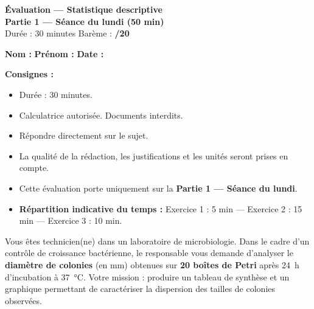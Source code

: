 \documentclass[11pt,a4paper]{article}
\title{}
\author{}
\date{}
\begin{document}

\begin{center}
  {\Large \textbf{Évaluation — Statistique descriptive}}\\[0.2cm]
  {\large \textbf{Partie 1 — Séance du lundi (50 min)}}\\[0.2cm]
  {\large Durée : 30 minutes \hfill Barème : \textbf{/20}}
\end{center}

\vspace{0.3cm}

\textbf{Nom :} \dotfill \quad \textbf{Prénom :} \dotfill \quad \textbf{Date :} \dotfill

\vspace{0.4cm}

\begin{consigne}
\textbf{Consignes :}
\begin{itemize}[leftmargin=*]
  \item Durée : 30 minutes.
  \item Calculatrice autorisée. Documents interdits.
  \item Répondre directement sur le sujet.
  \item La qualité de la rédaction, les justifications et les unités seront prises en compte.
  \item Cette évaluation porte uniquement sur la \textbf{Partie 1 — Séance du lundi}.
  \item \textbf{Répartition indicative du temps :} Exercice 1 : 5 min — Exercice 2 : 15 min — Exercice 3 : 10 min.
\end{itemize}
\end{consigne}

\vspace{0.3cm}

\begin{contexte}
Vous êtes technicien(ne) dans un laboratoire de microbiologie. Dans le cadre d’un contrôle de croissance bactérienne, le responsable vous demande d’analyser le \textbf{diamètre de colonies} (en mm) obtenues sur \textbf{20 boîtes de Petri} après 24~h d’incubation à 37~°C. Votre mission : produire un tableau de synthèse et un graphique permettant de caractériser la dispersion des tailles de colonies observées.
\end{contexte}

\vspace{0.4cm}

\end{document}
